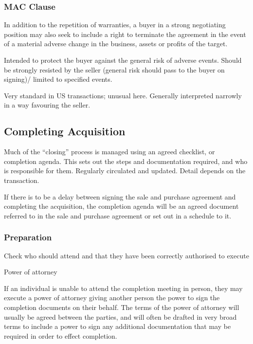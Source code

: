 \documentclass[
]{article}
\newenvironment{env-48e9bfc8-c3dd-4504-a5fa-3b34b9a27ccf}
{
    \savenotes\tcolorbox[blanker,breakable,left=5pt,borderline west={2pt}{-4pt}{blue}]
}
{
    \endtcolorbox\spewnotes
}
\begin{document}
\hypertarget{mac-clause}{%
\subsubsection{MAC Clause}\label{mac-clause}}

In addition to the repetition of warranties, a buyer in a strong
negotiating position may also seek to include a right to terminate the
agreement in the event of a material adverse change in the business,
assets or profits of the target.

Intended to protect the buyer against the general risk of adverse
events. Should be strongly resisted by the seller (general risk should
pass to the buyer on signing)/ limited to specified events.

Very standard in US transactions; unusual here. Generally interpreted
narrowly in a way favouring the seller.

\hypertarget{completing-acquisition}{%
\subsection{Completing Acquisition}\label{completing-acquisition}}

Much of the ``closing'' process is managed using an agreed checklist, or
completion agenda. This sets out the steps and documentation required,
and who is responsible for them. Regularly circulated and updated.
Detail depends on the transaction.

If there is to be a delay between signing the sale and purchase
agreement and completing the acquisition, the completion agenda will be
an agreed document referred to in the sale and purchase agreement or set
out in a schedule to it.

\hypertarget{preparation}{%
\subsubsection{Preparation}\label{preparation}}

Check who should attend and that they have been correctly authorised to
execute

\begin{env-48e9bfc8-c3dd-4504-a5fa-3b34b9a27ccf}

Power of attorney

If an individual is unable to attend the completion meeting in person,
they may execute a power of attorney giving another person the power to
sign the completion documents on their behalf. The terms of the power of
attorney will usually be agreed between the parties, and will often be
drafted in very broad terms to include a power to sign any additional
documentation that may be required in order to effect completion.

\end{env-48e9bfc8-c3dd-4504-a5fa-3b34b9a27ccf}
\end{document}
